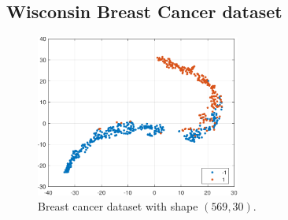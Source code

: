 \documentclass{article}
\begin{document}
    \subsection{Wisconsin Breast Cancer dataset}
        \begin{figure}
            \centering
            \includegraphics[width=0.60\textwidth]{Assignment 1/figures/breast_data.pdf}
            \caption{Breast cancer dataset with shape $(569,30)$.}
            \label{fig:breast_cancer_dataset}
        \end{figure}
        
\end{document}
